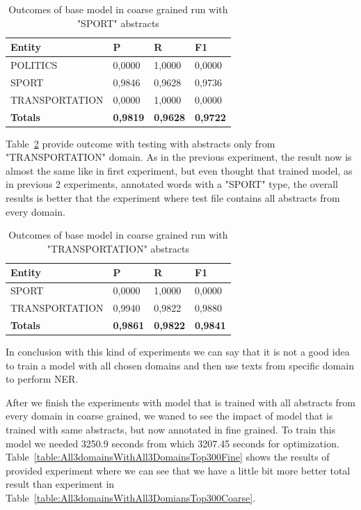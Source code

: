 \documentclass[thesis=M,english]{FITthesis}[2018/05/30]
\begin{document}
	\begin{table}[H]\centering
		\begin{tabular}{|l|l|l|l|}
			\hline {\textbf{Entity}} & {\textbf{P}} & {\textbf{R}} & {\textbf{F1}}\\\hline
				POLITICS & 0,0000 & 1,0000 & 0,0000\\
				SPORT & 0,9846 & 0,9628 & 0,9736\\
				TRANSPORTATION & 0,0000 & 1,0000 & 0,0000\\\hline
				\textbf{Totals} & \textbf{0,9819} & \textbf{0,9628} & \textbf{0,9722}\\\hline
		\end{tabular}
		\caption{Outcomes of base model in coarse grained run with "SPORT" abstracts \label{table:All3domainsWithSportTop300Coarse}}
	\end{table}	
	
	Table~\ref{table:All3domainsWithTransportationTop300Coarse} provide outcome with testing with abstracts only from "TRANSPORTATION" domain. As in the previous experiment, the result now is almost the same like in first experiment, but even thought that trained model, as in previous 2 experiments, annotated words with a "SPORT" type, the overall results is better that the experiment where test file contains all abstracts from every domain. 
	
	\begin{table}[H]\centering
		\begin{tabular}{|l|l|l|l|}
			\hline {\textbf{Entity}} & {\textbf{P}} & {\textbf{R}} & {\textbf{F1}}\\\hline
				SPORT & 0,0000 & 1,0000 & 0,0000\\
				TRANSPORTATION & 0,9940 & 0,9822 & 0,9880\\\hline
				\textbf{Totals} & \textbf{0,9861} & \textbf{0,9822} & \textbf{0,9841}\\\hline
		\end{tabular}
	\caption{Outcomes of base model in coarse grained run with "TRANSPORTATION" abstracts \label{table:All3domainsWithTransportationTop300Coarse}}
	\end{table}	
	
	In conclusion with this kind of experiments we can say that it is not a good idea to train a model with all chosen domains and then use texts from specific domain to perform NER.
	
	After we finish the experiments with model that is trained with all abstracts from every domain in coarse grained, we waned to see the impact of model that is trained with same abstracts, but now annotated in fine grained. To train this model we needed 3250.9 seconds from which 3207.45 seconds for optimization. Table~\ref{table:All3domainsWithAll3DomainsTop300Fine} shows the results of provided experiment where we can see that we have a little bit more better total result than experiment in Table~\ref{table:All3domainsWithAll3DomiansTop300Coarse}.
\end{document}
